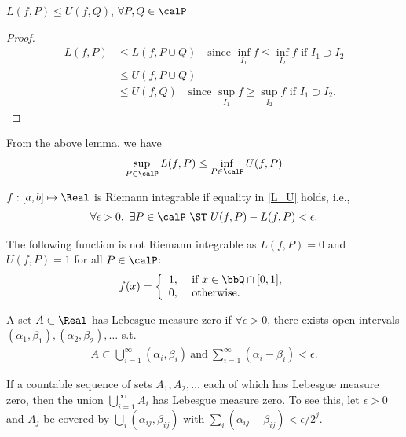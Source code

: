 \documentclass[../aipt.tex]{subfiles}
\begin{document}
\begin{Lemma}
$L(f,P)\leq U(f,Q)$, $\forall P,Q \in \calP$
\end{Lemma}
\begin{proof}
\begin{align*}
L(f,P)&\leq L(f,P\cup Q)\quad \text{since $\inf_{I_1} f \leq \inf_{I_2} f$ if $I_1 \supset I_2$}\\
&\leq U(f,P\cup Q)\\
&\leq U(f,Q)\quad \text{since $\sup_{I_1} f \geq \sup_{I_2} f$ if $I_1 \supset I_2$}.
\end{align*}
\end{proof}

From the above lemma, we have
\begin{align}\label{L_U}
\sup_{P\in\calP}{L(f,P)}\leq\inf_{P\in\calP}{U(f,P)}
\end{align}

\begin{Definition}
$f:[a,b]\mapsto \Real$ is Riemann integrable if equality in \cref{L_U} holds, i.e.,
\begin{align*}
\forall \epsilon >0,\ \exists P \in \calP\ \ST\ U(f,P)-L(f,P)<\epsilon.
\end{align*}
\end{Definition}

\begin{Example}
The following function is not Riemann integrable as $L(f,P)=0$ and $U(f,P)=1$ for all $P\in\calP$:
\begin{align*}
f(x)=\left\{
 \begin{array}{ll}
 1,&\ \text{if $x\in\bbQ\cap[0,1]$}, \\
 0,&\ \text{otherwise}.  
 \end{array}
\right.
\end{align*}
\end{Example}

\begin{Definition}
A set $A \subset \Real$ has Lebesgue measure zero if $\forall\epsilon> 0$, there exists open intervals $(\alpha_1,\beta_1),(\alpha_2,\beta_2),\ldots$ s.t. 
\begin{align*}
A \subset \bigcup_{i=1}^{\infty}(\alpha_i,\beta_i)\ \text{and}\ \sum_{i=1}^{\infty}(\alpha_i-\beta_i)<\epsilon.
\end{align*}
\end{Definition}

If a countable sequence of sets $A_1,A_2,\ldots$ each of which has Lebesgue measure zero, then the union $\bigcup^{\infty}_{i=1}{A_i}$ has Lebesgue measure zero. To see this, let $\epsilon>0$ and $A_j$ be covered by $\bigcup_i{(\alpha_{ij},\beta_{ij})}$ with $\sum_i(\alpha_{ij}-\beta_{ij})<\epsilon/2^j$.
\end{document}
